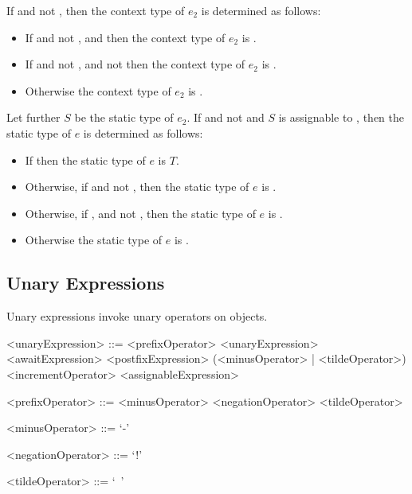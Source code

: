 \documentclass[makeidx]{article}
\begin{document}
If  and not , then
the context type of $e_2$ is determined as follows:
\begin{itemize}
  \item{} If  and not ,
      and 
      then the context type of $e_2$ is .
  \item{} If  and not ,
      and not 
     then the context type of $e_2$ is .
  \item{} Otherwise the context type of $e_2$ is .
\end{itemize}
Let further $S$ be the static type of $e_2$.
If  and not 
and $S$ is assignable to ,
then the static type of $e$ is determined as follows:
\begin{itemize}
  \item{} If 
    then the static type of $e$ is $T$.
  \item{} Otherwise, if 
    and not ,
    then the static type of $e$ is .
  \item{} Otherwise, if ,
     and not ,
    then the static type of $e$ is .
  \item{} Otherwise the static type of $e$ is .
\end{itemize}


\subsection{Unary Expressions}

\LMHash{}%
Unary expressions invoke unary operators on objects.

\begin{grammar}
<unaryExpression> ::= <prefixOperator> <unaryExpression>
  \alt <awaitExpression>
  \alt <postfixExpression>
  \alt (<minusOperator> | <tildeOperator>) \SUPER{}
  \alt <incrementOperator> <assignableExpression>

<prefixOperator> ::= <minusOperator>
  \alt <negationOperator>
  \alt <tildeOperator>

<minusOperator> ::= `-'

<negationOperator> ::= `!'

<tildeOperator> ::= `~'
\end{grammar}
\end{document}
